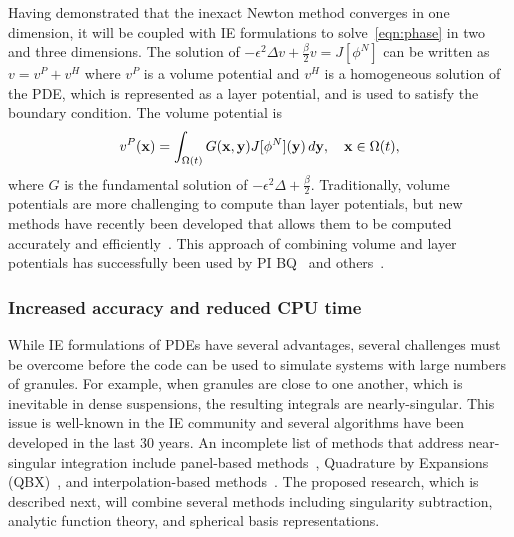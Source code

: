 Having demonstrated that the inexact Newton method converges in one
dimension, it will be coupled with IE formulations to
solve~\eqref{eqn:phase} in two and three dimensions. The solution of
$-\epsilon^2 \Delta v + \tfrac{\beta}{2} v = J[\phi^N]$ can be written
as $v = v^P + v^H$ where $v^P$ is a volume potential and $v^H$ is a
homogeneous solution of the PDE, which is represented as a layer
potential, and is used to satisfy the boundary condition. The volume
potential is
\begin{align*}
  v^{P}(\mathbf{x}) = \int_{\Omega(t)} G(\mathbf{x},\mathbf{y}) J[\phi^N](\mathbf{y})\, d\mathbf{y}, 
    \quad \mathbf{x} \in \Omega(t),
\end{align*}
where $G$ is the fundamental solution of $-\epsilon^2 \Delta +
\tfrac{\beta}{2}$. Traditionally, volume potentials are more challenging
to compute than layer potentials, but new methods have recently been
developed that allows them to be computed accurately and
efficiently~\cite{fry-leh-tor2018, and-zhu-vee2022}. This approach of
combining volume and layer potentials has successfully been used by PI
BQ~\cite{kro-qua2010} and others~\cite{fry-kro-tor2019, kli-ask-kro2020,
che-hua-lei2005}.

\subsubsection{Increased accuracy and reduced CPU time}
\label{subsec:NumericalIssues}
While IE formulations of PDEs have several advantages, several
challenges must be overcome before the code can be used to simulate
systems with large numbers of granules. For example, when granules are
close to one another, which is inevitable in dense suspensions, the
resulting integrals are nearly-singular. This issue is well-known in the
IE community and several algorithms have been developed in the last 30
years. An incomplete list of methods that address near-singular
integration include panel-based methods~\cite{helsing_2008a,
helsing_tutorial_2012}, Quadrature by Expansions
(QBX)~\cite{din-hua-mar-tan2021, klo-bar-gre-one2013, ste-bar2022,
af2018sisc}, and interpolation-based methods~\cite{ying_2006,
qua-bir2014, rah-vee-zor-bir2015}. The proposed research, which is
described next,  will combine several methods including singularity
subtraction, analytic function theory, and spherical basis
representations.

